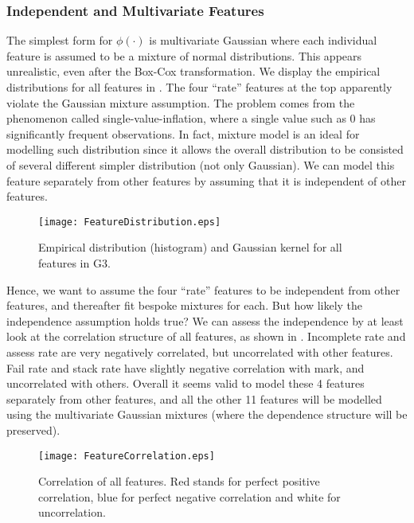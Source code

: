 \subsubsection{Independent and Multivariate Features}

The simplest form for $\phi(\cdot)$ is multivariate Gaussian where each individual feature is assumed to be a mixture of normal distributions. This appears unrealistic, even after the Box-Cox transformation. We display the empirical distributions for all features in . The four ``rate'' features at the top apparently violate the Gaussian mixture assumption. The problem comes from the phenomenon called single-value-inflation, where a single value such as 0 has significantly frequent observations. In fact, mixture model is an ideal for modelling such distribution since it allows the overall distribution to be consisted of several different simpler distribution (not only Gaussian). We can model this feature separately from other features by assuming that it is independent of other features.

\begin{figure}[!h]
\vspace*{-0.3cm}
\centering
\texttt{[image: FeatureDistribution.eps]}
\caption{Empirical distribution (histogram) and Gaussian kernel for all features in G3.}
\label{fig:featureDistribution}
\end{figure}

Hence, we want to assume the four ``rate'' features to be independent from other features, and thereafter fit bespoke mixtures for each. But how likely the independence assumption holds true? We can assess the independence by at least look at the correlation structure of all features, as shown in . Incomplete rate and assess rate are very negatively correlated, but uncorrelated with other features. Fail rate and stack rate have slightly negative correlation with mark, and uncorrelated with others. Overall it seems valid to model these 4 features separately from other features, and all the other 11 features will be modelled using the multivariate Gaussian mixtures (where the dependence structure will be preserved).

\begin{figure}[!h]
\centering
\texttt{[image: FeatureCorrelation.eps]}
\vspace*{-0.3cm}
\caption{Correlation of all features. Red stands for perfect positive correlation, blue for perfect negative correlation and white for uncorrelation.}
\label{fig:featureCorrelation}
\end{figure}

